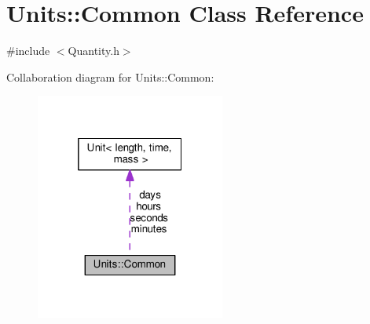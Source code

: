 \hypertarget{class_units_1_1_common}{\section{Units\+:\+:Common Class Reference}
\label{class_units_1_1_common}
}


{\ttfamily \#include $<$Quantity.\+h$>$}



Collaboration diagram for Units\+:\+:Common\+:\nopagebreak
\begin{figure}[H]
\begin{center}
\leavevmode
\includegraphics[width=176pt]{class_units_1_1_common__coll__graph}
\end{center}
\end{figure}
